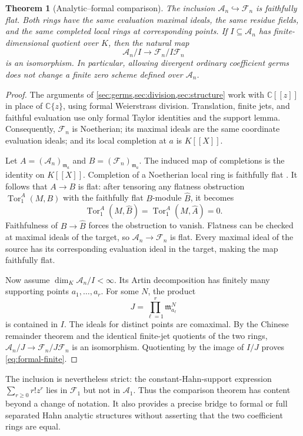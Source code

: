 \documentclass[11pt,letterpaper]{article}
\newtheorem{theorem}{Theorem}[section]
\theoremstyle{definition}
\theoremstyle{remark}
\newcommand{\C}{\mathbb C}
\newcommand{\A}{\mathscr A}
\newcommand{\m}{\mathfrak m}
\numberwithin{equation}{section}
\begin{document}
\begin{theorem}[Analytic--formal comparison]\label{thm:formal-comparison}
The inclusion $\A_n\hookrightarrow\mathscr F_n$ is faithfully flat. Both rings have the same evaluation maximal ideals, the same residue fields, and the same completed local rings at corresponding points. If $I\subseteq\A_n$ has finite-dimensional quotient over $K$, then the natural map
\begin{equation}\label{eq:formal-finite}
 \A_n/I\longrightarrow\mathscr F_n/I\mathscr F_n
\end{equation}
is an isomorphism. In particular, allowing divergent ordinary coefficient germs does not change a finite zero scheme defined over $\A_n$.
\end{theorem}
\begin{proof}
The arguments of \cref{sec:germs,sec:division,sec:structure} work with $\C[[z]]$ in place of $\C\{z\}$, using formal Weierstrass division. Translation, finite jets, and faithful evaluation use only formal Taylor identities and the support lemma. Consequently, $\mathscr F_n$ is Noetherian; its maximal ideals are the same coordinate evaluation ideals; and its local completion at $a$ is $K[[X]]$.

Let $A=(\A_n)_{\m_a}$ and $B=(\mathscr F_n)_{\m_a}$. The induced map of completions is the identity on $K[[X]]$. Completion of a Noetherian local ring is faithfully flat \cite[tag 00MC]{Stacks}. It follows that $A\to B$ is flat: after tensoring any flatness obstruction $\operatorname{Tor}_1^A(M,B)$ with the faithfully flat $B$-module $\widehat B$, it becomes
\[
 \operatorname{Tor}_1^A(M,\widehat B)
 =\operatorname{Tor}_1^A(M,\widehat A)=0.
\]
Faithfulness of $B\to\widehat B$ forces the obstruction to vanish. Flatness can be checked at maximal ideals of the target, so $\A_n\to\mathscr F_n$ is flat. Every maximal ideal of the source has its corresponding evaluation ideal in the target, making the map faithfully flat.

Now assume $\dim_K\A_n/I<\infty$. Its Artin decomposition has finitely many supporting points $a_1,\ldots,a_r$. For some $N$, the product
\[
 J=\prod_{\ell=1}^r\m_{a_\ell}^N
\]
is contained in $I$. The ideals for distinct points are comaximal. By the Chinese remainder theorem and the identical finite-jet quotients of the two rings, $\A_n/J\to\mathscr F_n/J\mathscr F_n$ is an isomorphism. Quotienting by the image of $I/J$ proves \eqref{eq:formal-finite}.
\end{proof}

The inclusion is nevertheless strict: the constant-Hahn-support expression $\sum_{r\ge0}r!z^r$ lies in $\mathscr F_1$ but not in $\A_1$. Thus the comparison theorem has content beyond a change of notation. It also provides a precise bridge to formal or full separated Hahn analytic structures without asserting that the two coefficient rings are equal.
\end{document}

